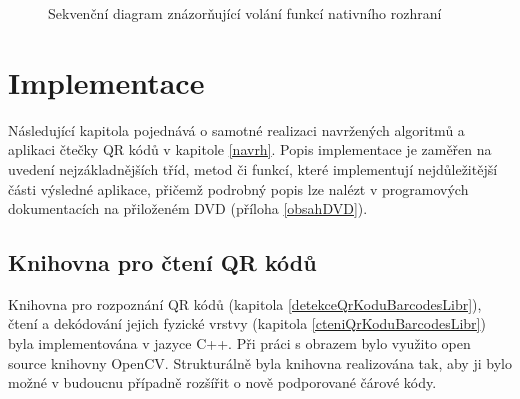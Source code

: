 \begin{figure}[H]
  \begin{center}
    \caption{Sekvenční diagram znázorňující volání funkcí nativního rozhraní}
    \label{QRReaderApplicationNativeCalls}
  \end{center}
\end{figure}

\chapter{Implementace}
\label{implementace}

Následující kapitola pojednává o samotné realizaci navržených algoritmů a 
aplikaci čtečky QR kódů v kapitole \ref{navrh}. Popis implementace je zaměřen na
uvedení nejzákladnějších tříd, metod či funkcí, které implementují nejdůležitější části
výsledné aplikace, přičemž podrobný popis lze nalézt v programových 
dokumentacích na přiloženém DVD (příloha \ref{obsahDVD}).

\section{Knihovna pro čtení QR kódů}
\label{knihovnaBarcodesLibrary}

Knihovna pro rozpoznání QR kódů (kapitola \ref{detekceQrKoduBarcodesLibr}),
čtení a dekódování jejich fyzické vrstvy (kapitola
\ref{cteniQrKoduBarcodesLibr}) byla implementována v jazyce C++.
Při práci s obrazem bylo využito open source knihovny OpenCV. Strukturálně byla
knihovna realizována tak, aby ji bylo možné v budoucnu případně rozšířit o
nově podporované čárové kódy.

